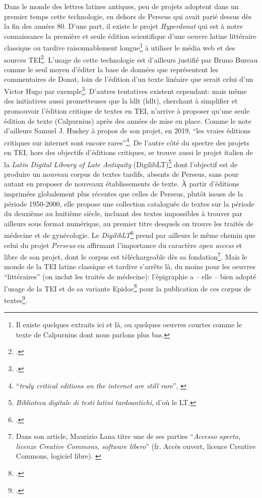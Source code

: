 Dans le monde des lettres latines antiques, peu de projets adoptent dans un premier temps cette technologie, en dehors de Perseus qui avait parié dessus dès la fin des années 80.  D'une part, il existe le projet \textit{Hyperdonat} qui est à notre connaissance la première et seule édition scientifique d'une oeuvre latine littéraire classique ou tardive raisonnablement longue\footnote{Il existe quelques extraits ici et là, ou quelques oeuvres courtes comme le texte de Calpurnius dont nous parlons plus bas.} à utiliser le média web et des sources TEI\footcite{bureau2008hyperdonat}. L'usage de cette technologie est d'ailleurs justifié par Bruno Bureau comme le seul moyen d'éditer la base de données que représentent les commentaires de Donat, loin de l'édition d'un texte linéaire que serait celui d'un Victor Hugo par exemple\footcite[La comparaison est la nôtre.]{chaire_de_recherche_sur_les_ecritures_numeriques_exemple_2018}. D'autres tentatives existent cependant: mais même des initiatives aussi prometteuses que la \acrfull{ldlt} (\acrshort{ldlt}), cherchant à simplifier et promouvoir l'édition critique de textes en TEI, n'arrive à proposer qu'une seule édition de texte (Calpurnius) après des années de mise en place. Comme le note d'ailleurs Samuel J. Huskey à propos de son projet, en 2019, ``les vraies éditions critiques sur internet sont encore rares''\footnote{``\textit{truly critical editions on the internet are still rare}'', \cite{huskey_digital_2019}}. De l'autre côté du spectre des projets en TEI, hors des objectifs d'éditions critiques, se trouve aussi le projet italien de la  \textit{Latin Digital Library of Late Antiquity} (DigilibLT)\footnote{\textit{Biblioteca digitale di testi latini tardoantichi}, d'où le LT.} dont l'objectif est de produire un nouveau corpus de textes tardifs, absents de Perseus, sans pour autant en proposer de nouveaux établissements de texte. À partir d'éditions imprimées globalement plus récentes que celles de Perseus, plutôt issues de la période 1950-2000, elle propose une collection cataloguée de textes sur la période du deuxième au huitième siècle, incluant des textes impossibles à trouver par ailleurs sous format numérique, au premier titre desquels on trouve les traités de médecine et de gynécologie. Le \textit{DigilibLT}\footcite{lana_metodologie_2012} prend par ailleurs le même chemin que celui du projet \textit{Perseus} en affirmant l'importance du caractère \textit{open access} et libre de son projet, dont le corpus est téléchargeable dès sa fondation\footnote{Dans son article, Maurizio Lana titre une de ses parties ``\textit{Accesso aperto, licenze Creative Commons, software libero}'' (fr. Accès ouvert, licence Creative Commons, logiciel libre). \cite{lana_metodologie_2012}}. Mais le monde de la TEI latine classique et tardive s'arrête là, du moins pour les oeuvres ``littéraires'' (on inclut les traités de médecine): l'épigraphie a -- elle -- bien adopté l'usage de la TEI et de sa variante Epidoc\footcite{elliott2007epidoc} pour la publication de ces corpus de textes\footcite{bodard2007inscriptions,cayless2010epigraphy}.

